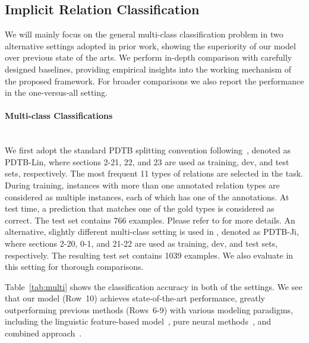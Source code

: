 \documentclass[11pt,a4paper]{article}
\begin{document}
\subsection{Implicit Relation Classification}
We will mainly focus on the general multi-class classification problem in two alternative settings adopted in prior work, showing the superiority of our model over previous state of the arts. We perform in-depth comparison with carefully designed baselines, providing empirical insights into the working mechanism of the proposed framework. For broader comparisons we also report the performance in the one-versus-all setting.

\paragraph{Multi-class Classifications}\quad\\
We first adopt the standard PDTB splitting convention following~\cite{lin2009recognizing}, denoted as PDTB-Lin, where sections 2-21, 22, and 23 are used as training, dev, and test sets, respectively. The most frequent 11 types of relations are selected in the task. During training, instances with more than one annotated relation types are considered as multiple instances, each of which has one of the annotations. At test time, a prediction that matches one of the gold types is considered as correct. The test set contains 766 examples. Please refer to \cite{lin2009recognizing} for more details. An alternative, slightly different multi-class setting is used in \cite{ji2015one}, denoted as PDTB-Ji, where sections 2-20, 0-1, and 21-22 are used as training, dev, and test sets, respectively. The resulting test set contains 1039 examples. We also evaluate in this setting for thorough comparisons.

Table~\ref{tab:multi} shows the classification accuracy in both of the settings. We see that our model (Row~10) achieves state-of-the-art performance, greatly outperforming previous methods (Rows~6-9) with various modeling paradigms, including the linguistic feature-based model~\cite{lin2009recognizing}, pure neural methods~\cite{qin2016stacking}, and combined approach~\cite{ji2015one}.
\end{document}
